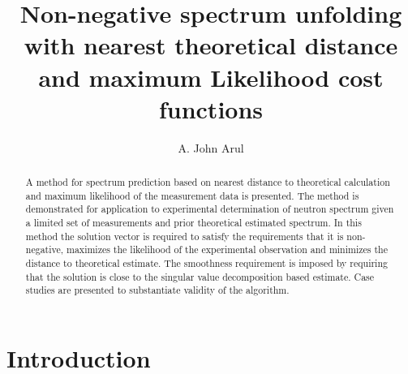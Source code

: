 \documentclass[review]{elsarticle}
\title{Non-negative spectrum unfolding with nearest theoretical distance and maximum Likelihood cost functions}
\author{A. John Arul}
\begin{document}
\begin{titlepage}
\maketitle

\vspace{50mm}
\begin{abstract}
A method for spectrum prediction based on nearest distance to theoretical calculation and maximum likelihood of the measurement data is presented.  The method is demonstrated for application to experimental determination of neutron spectrum given a limited set of measurements and prior theoretical estimated spectrum. In this method the solution vector is required to satisfy the requirements that it is non-negative, maximizes the likelihood of the experimental observation and minimizes the distance to theoretical estimate. The smoothness requirement is imposed by requiring that the solution is close to the singular value decomposition based estimate.  Case studies are presented to substantiate validity of the algorithm. 
\end{abstract}

\end{titlepage} 


\maketitle 

\section{Introduction}
\end{document}
